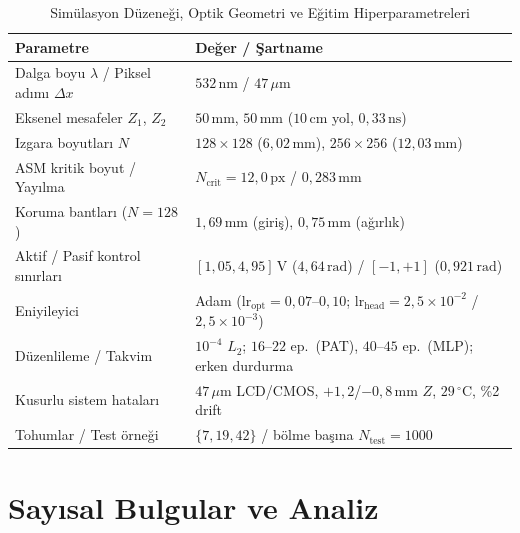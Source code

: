 \documentclass[journal]{IEEEtran}
\begin{document}
\begin{table}[!t]
  \centering
  \caption{Sim\"ulasyon D\"uzene\u{g}i, Optik Geometri ve E\u{g}itim Hiperparametreleri}
  \label{tab:sim_setup}
  \begin{tabular}{@{}ll@{}}
    \toprule
    \textbf{Parametre} & \textbf{De\u{g}er / \c{S}artname} \\
    \midrule
    Dalga boyu $\lambda$ / Piksel ad\i{}m\i{} $\Delta x$ & $532\,\text{nm}$ / $47\,\mu\text{m}$ \\
    Eksenel mesafeler $Z_1$, $Z_2$ & $50\,\text{mm}$, $50\,\text{mm}$ ($10\,\text{cm}$ yol, $0{,}33\,\text{ns}$) \\
    Izgara boyutlar\i{} $N$ & $128\times 128$ ($6{,}02\,\text{mm}$), $256\times 256$ ($12{,}03\,\text{mm}$) \\
    ASM kritik boyut / Yay\i{}lma & $N_{\mathrm{crit}} = 12{,}0\,\text{px}$ / $0{,}283\,\text{mm}$ \\
    Koruma bantlar\i{} ($N=128$) & $1{,}69\,\text{mm}$ (giri\c{s}), $0{,}75\,\text{mm}$ (a\u{g}\i{}rl\i{}k) \\
    Aktif / Pasif kontrol s\i{}n\i{}rlar\i{} & $[1{,}05, 4{,}95]\,\text{V}$ ($4{,}64\,\text{rad}$) / $[-1, +1]$ ($0{,}921\,\text{rad}$) \\
    Eniyileyici & Adam ($\text{lr}_{\mathrm{opt}}=0{,}07\text{--}0{,}10$; $\text{lr}_{\mathrm{head}}=2{,}5\times 10^{-2}$ / $2{,}5\times 10^{-3}$) \\
    D\"uzenlileme / Takvim & $10^{-4}$ $L_2$; $16\text{--}22$ ep.\ (PAT), $40\text{--}45$ ep.\ (MLP); erken durdurma \\
    Kusurlu sistem hatalar\i{} & $47\,\mu\text{m}$ LCD/CMOS, $+1{,}2$/$-0{,}8\,\text{mm}$ $Z$, $29\,^\circ\text{C}$, \%2 drift \\
    Tohumlar / Test \"orne\u{g}i & $\{7, 19, 42\}$ / b\"olme ba\c{s}\i{}na $N_{\mathrm{test}}=1000$ \\
    \bottomrule
  \end{tabular}
\end{table}

\section{Say\i{}sal Bulgular ve Analiz}
\end{document}
